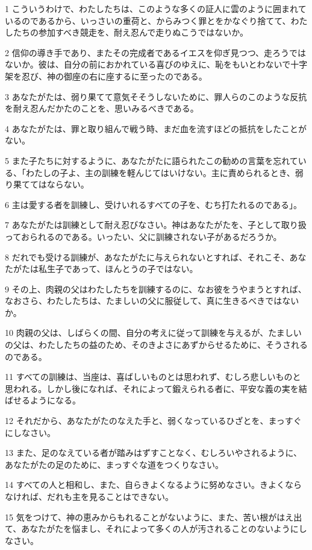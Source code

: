 \par 1 こういうわけで、わたしたちは、このような多くの証人に雲のように囲まれているのであるから、いっさいの重荷と、からみつく罪とをかなぐり捨てて、わたしたちの参加すべき競走を、耐え忍んで走りぬこうではないか。
\par 2 信仰の導き手であり、またその完成者であるイエスを仰ぎ見つつ、走ろうではないか。彼は、自分の前におかれている喜びのゆえに、恥をもいとわないで十字架を忍び、神の御座の右に座するに至ったのである。
\par 3 あなたがたは、弱り果てて意気そそうしないために、罪人らのこのような反抗を耐え忍んだかたのことを、思いみるべきである。
\par 4 あなたがたは、罪と取り組んで戦う時、まだ血を流すほどの抵抗をしたことがない。
\par 5 また子たちに対するように、あなたがたに語られたこの勧めの言葉を忘れている、「わたしの子よ、主の訓練を軽んじてはいけない。主に責められるとき、弱り果ててはならない。
\par 6 主は愛する者を訓練し、受けいれるすべての子を、むち打たれるのである」。
\par 7 あなたがたは訓練として耐え忍びなさい。神はあなたがたを、子として取り扱っておられるのである。いったい、父に訓練されない子があるだろうか。
\par 8 だれでも受ける訓練が、あなたがたに与えられないとすれば、それこそ、あなたがたは私生子であって、ほんとうの子ではない。
\par 9 その上、肉親の父はわたしたちを訓練するのに、なお彼をうやまうとすれば、なおさら、わたしたちは、たましいの父に服従して、真に生きるべきではないか。
\par 10 肉親の父は、しばらくの間、自分の考えに従って訓練を与えるが、たましいの父は、わたしたちの益のため、そのきよさにあずからせるために、そうされるのである。
\par 11 すべての訓練は、当座は、喜ばしいものとは思われず、むしろ悲しいものと思われる。しかし後になれば、それによって鍛えられる者に、平安な義の実を結ばせるようになる。
\par 12 それだから、あなたがたのなえた手と、弱くなっているひざとを、まっすぐにしなさい。
\par 13 また、足のなえている者が踏みはずすことなく、むしろいやされるように、あなたがたの足のために、まっすぐな道をつくりなさい。
\par 14 すべての人と相和し、また、自らきよくなるように努めなさい。きよくならなければ、だれも主を見ることはできない。
\par 15 気をつけて、神の恵みからもれることがないように、また、苦い根がはえ出て、あなたがたを悩まし、それによって多くの人が汚されることのないようにしなさい。

